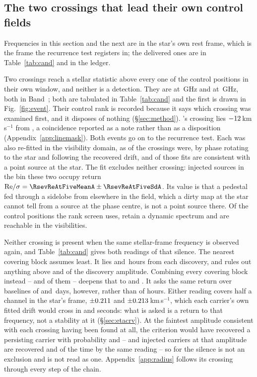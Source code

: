 \subsection{The two crossings that lead their own control fields}
\label{sec:vistest}

Frequencies in this section and the next are in the star's own rest frame,
which is the frame the recurrence test registers in; the delivered ones are in
Table~\ref{tab:cand} and in the ledger.

Two crossings reach a stellar statistic above every one of the \NCtrl{}
control positions in their own window, and neither is a detection. They are
\EvAStar{} at \RqFreqSx\,GHz and \EvBStar{} at \RqFreqCp\,GHz, both in
Band~\EvABand; both are tabulated in Table~\ref{tab:cand} and the first is
drawn in Fig.~\ref{fig:event}. Their control rank is recorded because it says which crossing was examined
first, and it disposes of nothing (\S\ref{sec:method}).
\EvBStar's crossing lies $-12$\,km\,s$^{-1}$ from \EvBLine, a coincidence
reported as a note rather than as a disposition
(Appendix~\ref{app:linemask}). Both events go on to the recurrence test. Each was also re-fitted in the visibility domain, as \LgNFit{} of the
\NCross{} crossings were, by phase rotating to the star and following the
recovered drift, and \LgNLocalCor{} of those fits are consistent with a point
source at the star. The fit excludes neither crossing: injected sources in
the bin these two occupy return
${\rm Re}/\sigma=\RsevReAtFiveMeanA\pm\RsevReAtFiveSdA$. Its value is that a pedestal fed through a sidelobe from elsewhere in
the field, which a dirty map at the star cannot tell from a source at the
phase centre, is not a point source there. Of the \NCtrl{} control positions
the rank screen uses, \RcNRetCtrl{} retain a dynamic spectrum and
\RcNVisCtrl{} are reachable in the visibilities.

Neither crossing is present when the same stellar-frame frequency is observed
again, and Table~\ref{tab:cand} gives both readings of that silence. The nearest covering block assumes least. It lies \RcSxNearH{} and
\EvBDeepH\,hours from each discovery, and rules out anything above
\RqNearFracSx{} and \RqNearFracCp{} of the discovery amplitude. Combining every covering block instead -- \RqNRepSx{} and \RqNRepCp{} of
them -- deepens that to \RcSxFive{} and \RcCpFive. It asks the same return
over baselines of \RqSpanDSx{} and \RqSpanDCp\,days, however, rather than of
hours. Either
reading covers half a channel in the star's frame, $\pm0.211$ and
$\pm0.213$\,km\,s$^{-1}$, which each carrier's own fitted drift would
cross in \ZtSxLeaveSec{} and \ZtCpLeaveSec{} seconds: what is asked is a
return to that frequency, not a stability at it (\S\ref{sec:etacrv}). At the faintest amplitude consistent with each crossing
having been found at all, the criterion would have recovered a persisting
carrier with probability \RqPowerTrigSx{} and \RqPowerTrigCp{} -- and
injected carriers at that amplitude are recovered \RjMeasSx{} and
\RjMeasCp{} of the time by the same reading -- so for
\EvBStar{} the silence is not an exclusion and is not read as one.
Appendix~\ref{app:radius} follows its crossing through every step
of the chain.



